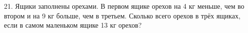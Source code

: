21. Ящики заполнены орехами. В первом ящике орехов на 4 кг меньше, чем во втором и на 9 кг больше, чем в третьем. Сколько всего орехов в трёх ящиках, если в самом маленьком ящике 13 кг орехов?\\
